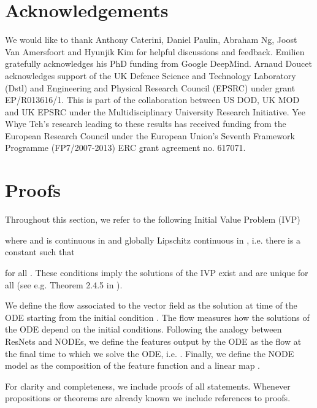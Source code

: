 \documentclass{article}
\begin{document}
\section*{Acknowledgements}
We would like to thank Anthony Caterini, Daniel Paulin, Abraham Ng, Joost Van Amersfoort and Hyunjik Kim for helpful discussions and feedback. Emilien gratefully acknowledges his PhD funding from Google DeepMind. Arnaud Doucet acknowledges support of the UK Defence Science and Technology Laboratory (Dstl) and Engineering and Physical Research Council (EPSRC) under grant EP/R013616/1.  This is part of the collaboration between US DOD, UK MOD and UK EPSRC under the Multidisciplinary University Research Initiative. Yee Whye Teh's research leading to these results has received funding from the European Research Council under the European Union's Seventh Framework Programme (FP7/2007-2013) ERC grant agreement no. 617071.




\vfill
\pagebreak









\appendix

\section{Proofs}

Throughout this section, we refer to the following Initial Value Problem (IVP)



where  and  is continuous in  and globally Lipschitz continuous in , i.e. there is a constant  such that



for all . These conditions imply the solutions of the IVP exist and are unique for all  (see e.g. Theorem 2.4.5 in \cite{ahmad2015textbook}).

We define the flow  associated to the vector field  as the solution at time  of the ODE starting from the initial condition . The flow measures how the solutions of the ODE depend on the initial conditions. Following the analogy between ResNets and NODEs, we define the features  output by the ODE as the flow at the final time  to which we solve the ODE, i.e. . Finally, we define the NODE model as the composition of the feature function  and a linear map .

For clarity and completeness, we include proofs of all statements. Whenever propositions or theorems are already known we include references to proofs.
\end{document}
